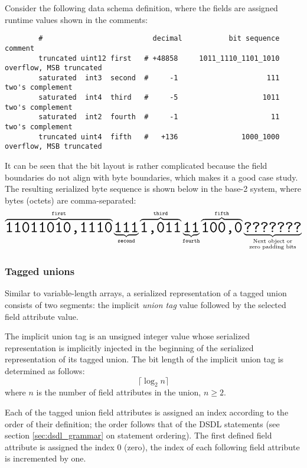 \begin{remark}
    Consider the following data schema definition,
    where the fields are assigned runtime values shown in the comments:

    \begin{verbatim}
        #                          decimal           bit sequence   comment
        truncated uint12 first   # +48858     1011_1110_1101_1010   overflow, MSB truncated
        saturated  int3  second  #     -1                     111   two's complement
        saturated  int4  third   #     -5                    1011   two's complement
        saturated  int2  fourth  #     -1                      11   two's complement
        truncated uint4  fifth   #   +136               1000_1000   overflow, MSB truncated
    \end{verbatim}

    It can be seen that the bit layout is rather complicated because the field boundaries do not align with byte
    boundaries, which makes it a good case study.
    The resulting serialized byte sequence is shown below in the base-2 system,
    where bytes (octets) are comma-separated:
    $$
        \overbrace{\hugett{11011010,1110}}^{\texttt{first}}%
        \underbrace{\hugett{111}}_{\texttt{second}}%
        \overbrace{\hugett{1,011}}^{\texttt{third}}%
        \underbrace{\hugett{11}}_{\texttt{fourth}}%
        \overbrace{\hugett{100,0}}^{\texttt{fifth}}%
        \underbrace{\hugett{???????}}_{\substack{\text{Next object or} \\ \text{zero padding bits}}}
    $$
\end{remark}

\subsubsection{Tagged unions}

Similar to variable-length arrays, a serialized representation of a tagged union consists of two segments:
the implicit \emph{union tag} value followed by the selected field attribute value.

The implicit union tag is an unsigned integer value whose serialized representation
is implicitly injected in the beginning of the serialized representation of its tagged union.
The bit length of the implicit union tag is determined as follows:
$$\lceil{}\log_2 n\rceil{}$$
where $n$ is the number of field attributes in the union, $n \geq 2$.

Each of the tagged union field attributes is assigned an index according to the order of their definition;
the order follows that of the DSDL statements (see section \ref{sec:dsdl_grammar} on statement ordering).
The first defined field attribute is assigned the index 0 (zero),
the index of each following field attribute is incremented by one.

